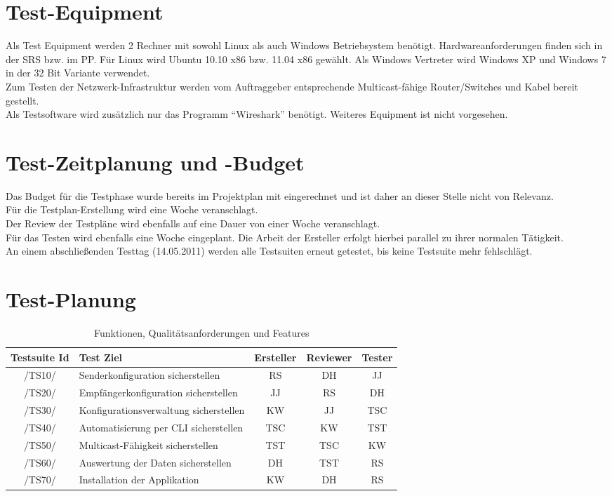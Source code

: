 \chapter{Test-Equipment}
Als Test Equipment werden 2 Rechner mit sowohl Linux als auch Windows Betriebsystem benötigt. Hardwareanforderungen finden sich in der SRS bzw. im PP.
Für Linux wird Ubuntu 10.10 x86 bzw. 11.04 x86 gewählt. Als Windows Vertreter wird Windows XP und Windows 7 in der 32 Bit Variante verwendet.\\
Zum Testen der Netzwerk-Infrastruktur werden vom Auftraggeber entsprechende Multicast-fähige Router/Switches und Kabel bereit gestellt.\\
Als Testsoftware wird zusätzlich nur das Programm "`Wireshark"' benötigt. Weiteres Equipment ist nicht vorgesehen.

\chapter{Test-Zeitplanung und -Budget}
Das Budget für die Testphase wurde bereits im Projektplan mit eingerechnet und ist daher an dieser Stelle nicht von Relevanz.\\
Für die Testplan-Erstellung wird eine Woche veranschlagt.\\ Der Review der Testpläne wird ebenfalls auf eine Dauer von einer Woche veranschlagt.\\
Für das Testen wird ebenfalls eine Woche eingeplant. Die Arbeit der Ersteller
erfolgt hierbei parallel zu ihrer normalen Tätigkeit.\\ An einem abschließenden
Testtag (14.05.2011) werden alle Testsuiten erneut getestet, bis keine Testsuite mehr fehlschlägt.\\

\chapter{Test-Planung}
\begin{table}[h]
\caption{Funktionen, Qualitätsanforderungen und Features}
\label{tab:features}
\begin{center}
\begin{tabular}{|c|p{6cm}|c|c|c|}
\hline
\textbf{Testsuite Id} & \textbf{Test Ziel} & \textbf{Ersteller} & \textbf{Reviewer} & \textbf{Tester}\\
\hline
/TS10/ & Senderkonfiguration sicherstellen & RS & DH & JJ\\
\hline
/TS20/ & Empfängerkonfiguration sicherstellen & JJ & RS & DH\\
\hline
/TS30/ & Konfigurationsverwaltung sicherstellen & KW & JJ & TSC\\
\hline
/TS40/ & Automatisierung per CLI sicherstellen & TSC & KW & TST\\
\hline
/TS50/ & Multicast-Fähigkeit sicherstellen & TST & TSC & KW\\
\hline
/TS60/ & Auswertung der Daten sicherstellen & DH & TST & RS\\
\hline
/TS70/ & Installation der Applikation & KW & DH & RS\\
\hline
\end{tabular}
\end{center}
\label{default}
\end{table}
